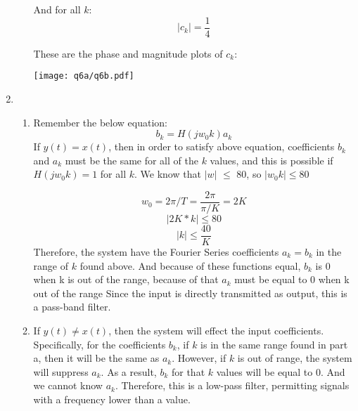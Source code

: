 \documentclass[10pt,a4paper, margin=1in]{article}
\begin{document}
\begin{enumerate}
\begin{enumerate}
    And for all $k$:
    \begin{equation*}
        |c_k| = \frac{1}{4}
    \end{equation*}

    These are the phase and magnitude plots of $c_k$:
    \begin{center}
    \texttt{[image: q6a/q6b.pdf]}
        
    \end{center}
    \end{enumerate}
    
\item %
    \begin{enumerate}
    \item %
Remember the below equation:
\begin{equation}
    b_k = H(jw_0k)a_k
\end{equation}
If $y(t)=x(t)$, then in order to satisfy above equation, coefficients $b_k$ and $a_k$ must be the same for all of the $k$ values, and this is possible if $H(jw_0k) = 1$ for all $k$. 
We know that $|w|$ $\leq$ 80, so $|w_0k|\leq 80$

\begin{equation}
    w_0 = 2\pi/T = \frac{2\pi}{\pi/K} = 2K
\end{equation}
\begin{equation}
    |2K*k| \leq 80
\end{equation}
\begin{equation}
    |k| \leq \frac{40}{K}
\end{equation}
Therefore, the system have the Fourier Series coefficients $a_k = b_k$ in the range of $k$ found above. And because of these functions equal, $b_k$ is 0 when k is out of the range, because of that $a_k$ must be equal to 0 when k out of the range Since the input is directly transmitted as output, this is a pass-band filter.
    \item %
If $y(t)\neq x(t)$, then the system will effect the input coefficients. Specifically, for the coefficients $b_k$, if $k$ is in the same range found in part a, then it will be the same as $a_k$. However, if $k$ is out of range, the system will suppress $a_k$. As a result, $b_k$ for that $k$ values will be equal to  $0$. And we cannot know $a_k$. Therefore, this is a low-pass filter, permitting signals with a frequency lower than a value.
    \end{enumerate}    
	

\end{enumerate}
\end{document}
